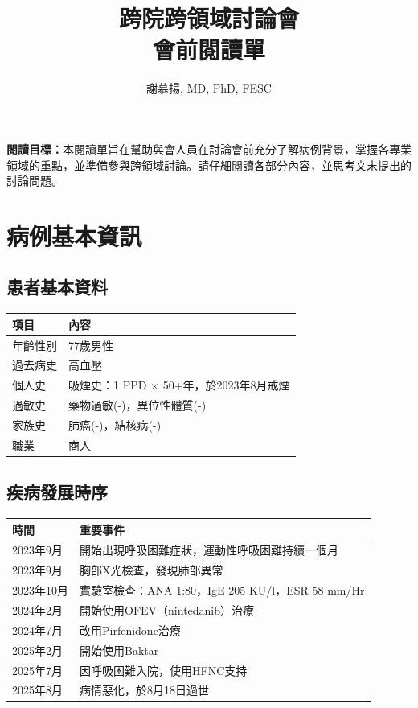 \documentclass{article}
\newcommand{\mydate}{\DTMtoday}
\begin{document}
\title{\textcolor{emergency_red}{跨院跨領域討論會\\會前閱讀單}}
\author{\textcolor{emergency_blue}{謝慕揚, MD, PhD, FESC}}
\date{\mydate}
\maketitle

\begin{importantbox}
\textbf{閱讀目標：}本閱讀單旨在幫助與會人員在討論會前充分了解病例背景，掌握各專業領域的重點，並準備參與跨領域討論。請仔細閱讀各部分內容，並思考文末提出的討論問題。
\end{importantbox}

\section{病例基本資訊}

\subsection{患者基本資料}
\begin{longtable}{p{3cm} p{12cm}}
\toprule
\textbf{項目} & \textbf{內容} \\
\midrule
年齡性別 & 77歲男性 \\
過去病史 & 高血壓 \\
個人史 & 吸煙史：1 PPD × 50+年，於2023年8月戒煙 \\
過敏史 & 藥物過敏(-)，異位性體質(-) \\
家族史 & 肺癌(-)，結核病(-) \\
職業 & 商人 \\
\bottomrule
\end{longtable}

\subsection{疾病發展時序}
\begin{longtable}{p{3cm} p{12cm}}
\toprule
\textbf{時間} & \textbf{重要事件} \\
\midrule
2023年9月 & 開始出現呼吸困難症狀，運動性呼吸困難持續一個月 \\
2023年9月 & 胸部X光檢查，發現肺部異常 \\
2023年10月 & 實驗室檢查：ANA 1:80，IgE 205 KU/l，ESR 58 mm/Hr \\
2024年2月 & 開始使用OFEV（nintedanib）治療 \\
2024年7月 & 改用Pirfenidone治療 \\
2025年2月 & 開始使用Baktar \\
2025年7月 & 因呼吸困難入院，使用HFNC支持 \\
2025年8月 & 病情惡化，於8月18日過世 \\
\bottomrule
\end{longtable}
\end{document}
